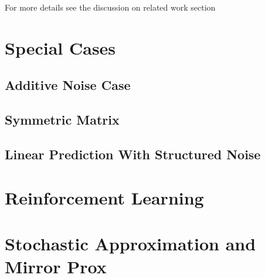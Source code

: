 \documentclass{article}
\begin{document}
For more details see the discussion on related work section


\section{Special Cases}
\subsection{Additive Noise Case}

\subsection{Symmetric Matrix}

\subsection{Linear Prediction With Structured Noise}


\section{Reinforcement Learning}

\section{Stochastic Approximation and Mirror Prox}
\end{document}
